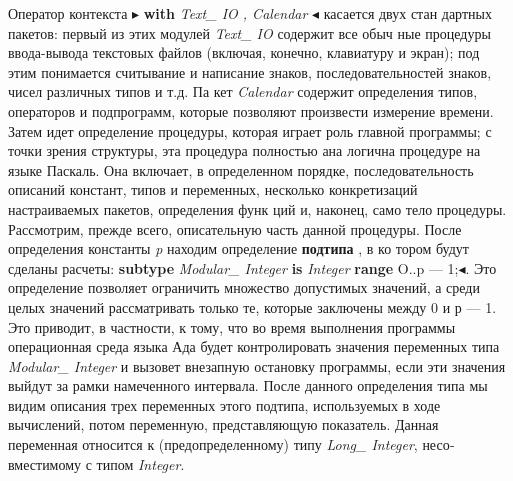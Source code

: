 \documentclass{mai_book}
\begin{document}
Оператор контекста  $\blacktriangleright$ {\bf with} {\it Text\_ IO , Calendar} $\blacktriangleleft$ касается двух стан­
дартных пакетов: первый из этих модулей {\it Text\_ IO} содержит все обыч­
ные процедуры ввода-вывода текстовых файлов (включая, конечно,
клавиатуру и экран); под этим понимается считывание и написание
знаков, последовательностей знаков, чисел различных типов и т.д. Па­
кет {\it Calendar} содержит определения типов, операторов и подпрограмм,
которые позволяют произвести измерение времени.
Затем идет определение процедуры, которая играет роль главной
программы; с точки зрения структуры, эта процедура полностью ана­
логична процедуре на языке Паскаль. Она включает, в определенном
порядке, последовательность описаний констант, типов и переменных,
несколько конкретизаций настраиваемых пакетов, определения функ­
ций и, наконец, само тело процедуры.
Рассмотрим, прежде всего, описательную часть данной процедуры.
После определения константы {\it p} находим определение {\bf подтипа} , в ко­
тором будут сделаны расчеты:  {\bf subtype} {\it Modular\_ Integer} {\bf is} {\it Integer} {\bf range} O..p — 1;$\blacktriangleleft$. 
Это определение позволяет ограничить множество
допустимых значений, а среди целых значений рассматривать только
те, которые заключены между 0 и р — 1. Это приводит, в частности, к
тому, что во время выполнения программы операционная среда языка
Ада будет контролировать значения переменных типа {\it Modular\_ Integer}
и вызовет внезапную остановку программы, если эти значения выйдут
за рамки намеченного интервала. После данного определения типа мы
видим описания трех переменных этого подтипа, используемых в ходе
вычислений, потом переменную, представляющую показатель. Данная
переменная относится к (предопределенному) типу {\it Long\_ Integer}, несо­
вместимому с типом {\it Integer}.
\end{document}
